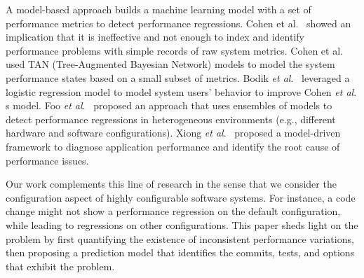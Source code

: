 A model-based approach builds %
a machine learning model with a set of performance metrics to detect performance regressions.  Cohen et al.~\cite{Cohen:2005:CIC} showed an implication that it is ineffective and not enough to index and identify performance problems with simple records of raw system metrics. Cohen et al. used TAN (Tree-Augmented Bayesian Network) models to model the system performance states based on a small subset of metrics. %
Bodik \emph{et al$.$}~\cite{bodik2008hilighter} leveraged a logistic regression model to model system users' behavior to improve Cohen \emph{et al$.$}\textquotesingle s model. %
Foo \emph{et al$.$}~\cite{DBLP:conf/icse/FooJAHZF15} proposed an approach that uses ensembles of models to detect performance regressions in heterogeneous environments (e.g., different hardware and software configurations). %
Xiong \emph{et al$.$}~\cite{Xiong:2013:VAM} proposed a model-driven framework to diagnose application performance and identify the root cause of performance issues. %


Our work complements this line of research in the sense that we consider the configuration aspect of highly configurable software systems. For instance, a code change might not show a performance regression on the default configuration, while leading to regressions on other configurations. This paper sheds light on the \inconsistent problem by first quantifying the existence of inconsistent performance variations, then proposing a prediction model that identifies the commits, tests, and options that exhibit the \inconsistent problem. 


